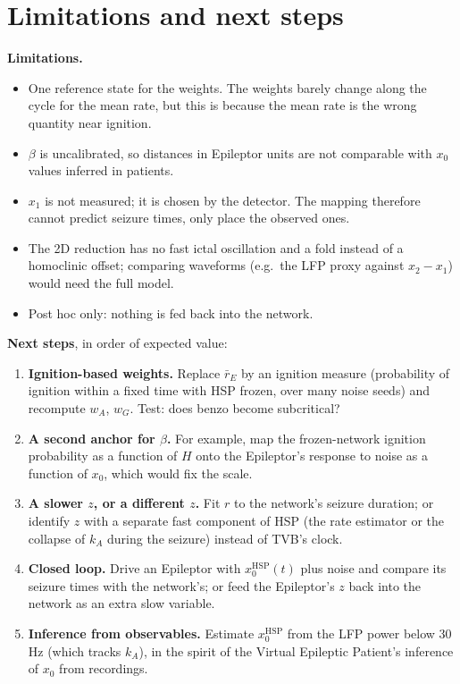 \documentclass[11pt]{article}
\newcommand{\kA}{k_A}
\newcommand{\xh}{x_0^{\mathrm{HSP}}}
\begin{document}
\section{Limitations and next steps}
\textbf{Limitations.}
\begin{itemize}
\item One reference state for the weights. The weights barely change along the cycle for the mean rate, but this is
because the mean rate is the wrong quantity near ignition.
\item $\beta$ is uncalibrated, so distances in Epileptor units are not comparable with $x_0$ values inferred in patients.
\item $x_1$ is not measured; it is chosen by the detector. The mapping therefore cannot predict seizure times, only
place the observed ones.
\item The 2D reduction has no fast ictal oscillation and a fold instead of a homoclinic offset; comparing waveforms
(e.g.\ the LFP proxy against $x_2 - x_1$) would need the full model.
\item Post hoc only: nothing is fed back into the network.
\end{itemize}

\textbf{Next steps}, in order of expected value:
\begin{enumerate}
\item \textbf{Ignition-based weights.} Replace $\bar r_E$ by an ignition measure (probability of ignition within a fixed
time with HSP frozen, over many noise seeds) and recompute $w_A$, $w_G$. Test: does benzo become subcritical?
\item \textbf{A second anchor for $\beta$.} For example, map the frozen-network ignition probability as a function of $H$
onto the Epileptor's response to noise as a function of $x_0$, which would fix the scale.
\item \textbf{A slower $z$, or a different $z$.} Fit $r$ to the network's seizure duration; or identify $z$ with a separate
fast component of HSP (the rate estimator or the collapse of $\kA$ during the seizure) instead of TVB's clock.
\item \textbf{Closed loop.} Drive an Epileptor with $\xh(t)$ plus noise and compare its seizure times with the network's;
or feed the Epileptor's $z$ back into the network as an extra slow variable.
\item \textbf{Inference from observables.} Estimate $\xh$ from the LFP power below 30\,Hz (which tracks $\kA$), in the spirit of
the Virtual Epileptic Patient's inference of $x_0$ from recordings.
\end{enumerate}
\end{document}
